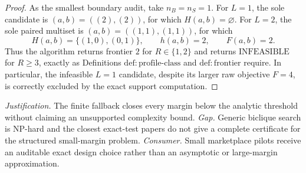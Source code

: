 \documentclass{article}
\begin{document}
\begin{proof}
As the smallest boundary audit, take \(n_B=n_S=1\).  For \(L=1\), the sole candidate is \((a,b)=((2),(2))\), for which \(H(a,b)=\varnothing\).  For \(L=2\), the sole paired multiset is \((a,b)=((1,1),(1,1))\), for which
\[
 H(a,b)=\{(1,0),(0,1)\},\qquad h(a,b)=2,\qquad F(a,b)=2.
\]
Thus the algorithm returns frontier \(2\) for \(R\in\{1,2\}\) and returns \(\mathrm{INFEASIBLE}\) for \(R\ge3\), exactly as Definitions \(\mathrm{def{:}profile\text{-}class}\) and \(\mathrm{def{:}frontier}\) require.  In particular, the infeasible \(L=1\) candidate, despite its larger raw objective \(F=4\), is correctly excluded by the exact support computation.
\end{proof}
\par\smallskip\noindent \textit{Justification.} The finite fallback closes every margin below the analytic threshold without claiming an unsupported complexity bound. \textit{Gap.} Generic biclique search is NP-hard and the closest exact-test papers do not give a complete certificate for the structured small-margin problem. \textit{Consumer.} Small marketplace pilots receive an auditable exact design choice rather than an asymptotic or large-margin approximation.
\end{document}
